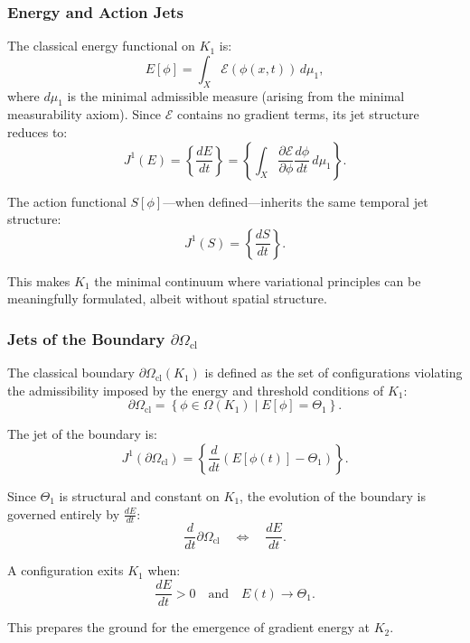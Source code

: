 \subsubsection{Energy and Action Jets}

The classical energy functional on $K_1$ is:
\[
E[\phi] = \int_X \mathcal{E}(\phi(x,t))\, d\mu_1,
\]
where $d\mu_1$ is the minimal admissible measure (arising from the
minimal measurability axiom). Since $\mathcal{E}$ contains no gradient
terms, its jet structure reduces to:
\[
J^1(E) = \left\{ \frac{dE}{dt} \right\}
=
\left\{
\int_X
\frac{\partial\mathcal{E}}{\partial\phi}
\frac{d\phi}{dt}\,
d\mu_1
\right\}.
\]

The action functional $S[\phi]$---when defined---inherits the same
temporal jet structure:
\[
J^1(S) = \left\{ \frac{dS}{dt} \right\}.
\]

This makes $K_1$ the minimal continuum where variational principles can
be meaningfully formulated, albeit without spatial structure.



\subsubsection{Jets of the Boundary \texorpdfstring{$\partial\Omega_{\mathrm{cl}}$}{Boundary}}

The classical boundary $\partial\Omega_{\mathrm{cl}}(K_1)$ is defined as
the set of configurations violating the admissibility imposed by the
energy and threshold conditions of $K_1$:
\[
\partial\Omega_{\mathrm{cl}} = \left\{ \phi\in\Omega(K_1) \mid E[\phi] = \Theta_1 \right\}.
\]

The jet of the boundary is:
\[
J^1(\partial\Omega_{\mathrm{cl}})
=
\left\{
\frac{d}{dt}\left(E[\phi(t)]-\Theta_1\right)
\right\}.
\]

Since $\Theta_1$ is structural and constant on $K_1$, the evolution of
the boundary is governed entirely by $\frac{dE}{dt}$:
\[
\frac{d}{dt}\partial\Omega_{\mathrm{cl}}
\quad\Longleftrightarrow\quad
\frac{dE}{dt}.
\]

A configuration exits $K_1$ when:
\[
\frac{dE}{dt} > 0
\quad\text{and}\quad
E(t) \to \Theta_1.
\]

This prepares the ground for the emergence of gradient energy at $K_2$.



